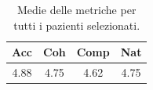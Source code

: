 
\begin{table}[!h]
\centering
\begin{tabular}{||c c c c||}
\hline
Acc & Coh & Comp & Nat \\ [0.5ex]
\hline\hline
4.88 & 4.75 & 4.62 & 4.75 \\
\hline
\end{tabular}
\caption{Medie delle metriche per tutti i pazienti selezionati.}
\label{tab:metriche_finali_pazienti}
\end{table}
